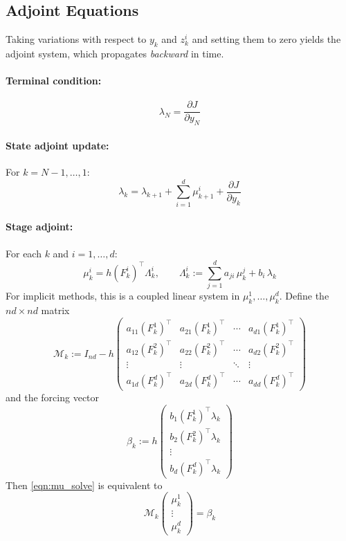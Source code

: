 \documentclass[11pt]{article}
\newcommand{\tp}{^\top}
\newcommand{\pder}[2]{\frac{\partial #1}{\partial #2}}
\begin{document}
\subsection{Adjoint Equations}

Taking variations with respect to $y_k$ and $z_k^i$ and setting them to zero yields the adjoint system, which propagates \emph{backward} in time.

\paragraph{Terminal condition:}
\begin{equation}
\lambda_N = \pder{J}{y_N}
\end{equation}

\paragraph{State adjoint update:} For $k = N-1, \ldots, 1$:
\begin{equation}
\label{eqn:lambda_update}
\boxed{
\lambda_k = \lambda_{k+1} + \sum_{i=1}^d \mu_{k+1}^i + \pder{J}{y_k}
}
\end{equation}

\paragraph{Stage adjoint:} For each $k$ and $i=1,\ldots,d$:
\begin{equation}
\label{eqn:mu_solve}
\boxed{
\mu_k^i = h (F_k^i)\tp \Lambda_k^i,
\qquad
\Lambda_k^i := \sum_{j=1}^d a_{ji}\,\mu_k^j + b_i\,\lambda_k
}
\end{equation}
For implicit methods, this is a coupled linear system in $\mu_k^1,\ldots,\mu_k^d$. Define the $nd\times nd$ matrix
\begin{equation}
\mathcal{M}_k := I_{nd} - h \begin{pmatrix}
a_{11}(F_k^1)\tp & a_{21}(F_k^1)\tp & \cdots & a_{d1}(F_k^1)\tp \\
a_{12}(F_k^2)\tp & a_{22}(F_k^2)\tp & \cdots & a_{d2}(F_k^2)\tp \\
\vdots & \vdots & \ddots & \vdots \\
a_{1d}(F_k^d)\tp & a_{2d}(F_k^d)\tp & \cdots & a_{dd}(F_k^d)\tp
\end{pmatrix}
\end{equation}
and the forcing vector
\begin{equation}
\beta_k := h \begin{pmatrix} b_1 (F_k^1)\tp \lambda_k \\ b_2 (F_k^2)\tp \lambda_k \\ \vdots \\ b_d (F_k^d)\tp \lambda_k \end{pmatrix}
\end{equation}
Then \eqref{eqn:mu_solve} is equivalent to
\begin{equation}
\mathcal{M}_k \begin{pmatrix} \mu_k^1 \\ \vdots \\ \mu_k^d \end{pmatrix} = \beta_k
\end{equation}
\end{document}
